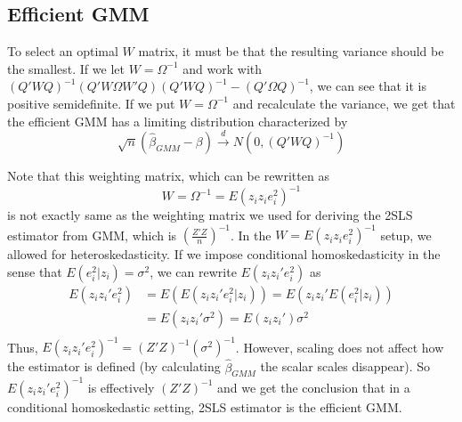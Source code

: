 \documentclass[12pt]{article}
\theoremstyle{definition}
\theoremstyle{property}
\theoremstyle{assumption}
\theoremstyle{example}
\theoremstyle{comment}
\begin{document}
\subsection{Efficient GMM}
To select an optimal $W$ matrix, it must be that the resulting variance should be the smallest. If we let $W=\Omega^{-1}$ and work with $(Q'WQ)^{-1}(Q'W\Omega W'Q)(Q'WQ)^{-1}-(Q'\Omega Q)^{-1}$, we can see that it is positive semidefinite.
If we put $W=\Omega^{-1}$ and  recalculate the variance, we get that the efficient GMM has a limiting distribution characterized by
\[
\sqrt{n}(\hat{\beta}_{GMM}-\beta)\xrightarrow{d}N(0,(Q'WQ)^{-1})
\]\par
Note that this weighting matrix, which can be rewritten as
\[
W=\Omega^{-1}=E(z_iz_ie_i^2)^{-1}
\]
is not exactly same as the weighting matrix we used for deriving the 2SLS estimator from GMM, which is $\left(\frac{Z'Z}{n}\right)^{-1}$. In the $W=E(z_iz_ie_i^2)^{-1}$ setup, we allowed for heteroskedasticity. If we impose conditional homoskedasticity in the sense that $E(e_i^2|z_i)=\sigma^2$, we can rewrite $E(z_iz_i'e_i^2)$ as
\[
\begin{aligned}
E(z_iz_i'e_i^2)&=E(E(z_iz_i'e_i^2|z_i))=E(z_iz_i'E(e_i^2|z_i))\\
&=E(z_iz_i'\sigma^2)=E(z_iz_i')\sigma^2\\
\end{aligned}
\]
Thus, $E(z_iz_i'e_i^2)^{-1}=(Z'Z)^{-1}(\sigma^2)^{-1}$. However, scaling does not affect how the estimator is defined (by calculating $\hat{\beta}_{GMM}$ the scalar scales disappear). So $E(z_iz_i'e_i^2)^{-1}$ is effectively $(Z'Z)^{-1}$ and we get the conclusion that in a conditional homoskedastic setting, 2SLS estimator is the efficient GMM. 
\end{document}
